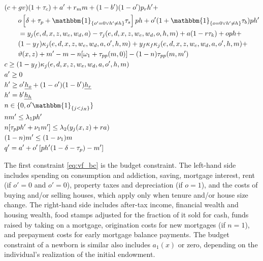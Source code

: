 \documentclass[parskip=full]{article}
\newcommand{\indicator}[1]{\mathbbm{1}_{\left\{ {#1} \right\} }}
\begin{document}
\begin{align}
  & (c+gv) (1+\tau_{c}) + a' + r_m m + (1-b')(1-o')p_{r}h' + \label{eq:vf_bc}\\
  & \qquad o\left[\delta + \tau_p + \indicator{o'=0\lor h'\neq h}\tau_s\right]ph + o' (1+\indicator{o=0\lor h'\neq h}\tau_b)ph'\notag\\
  & \qquad= y_{j}(e,d,x,z,w_{e},w_{d},a)-\tau_j(e,d,x,z,w_{e},w_{d},o,h,m) + a(1-r\tau_k)+ oph +\notag \\ &\qquad (1-y_{f})\kappa_{j}(e,d,x,z,w_{e},w_{d},a,o',h,m)+y_{f}\kappa_{f}\kappa_{j}(e,d,x,z,w_{e},w_{d},a,o',h,m)+\notag\\ & \qquad \vartheta(x,z) + m'-m- n[\omega_1+\tau_{pp}(m,0)] - (1-n)\tau_{pp}(m,m')\notag\\
  & c\geq (1-y_{f})\kappa_{j}(e,d,x,z,w_{e},w_{d},a,o',h,m)\label{eq:c_noneg}\\
  & a'\geq 0\label{eq:a_noneg}\\
  & h' \geq o'\underline{{h}_o} + (1-o')(1-b')\underline{{h}_r}\label{eq:vf_minhouse}\\
  & h' = b'\underline{{h}_h}\label{eq:vf_minhouse_homeless}\\
  & n\in \{0,o'\indicator{j<j_R}\}\label{eq:vf_orig}\\
  & n m' \leq \lambda_1 ph'\label{eq:vf_ltv}\\
  & n [\tau_p p h' + \nu_1 m'] \leq \lambda_2 (y_j(x,z) + ra)\label{eq:vf_gds}\\
  & (1-n)m'\leq (1-\nu_1) m \label{eq:vf_repay}\\
  & q' = a' + o' \left[p h'(1-\delta-\tau_p)-m'\right] \label{eq:networth}
\end{align}

The first constraint \eqref{eq:vf_bc} is the budget constraint. The left-hand side includes spending on consumption and addiction, saving, mortgage interest, rent (if $o'=0$ and $o'=0$), property taxes and depreciation (if $o=1$), and the costs of buying and/or selling houses, which apply only when tenure and/or house size change. The right-hand side includes after-tax income, financial wealth and housing wealth, food stamps adjusted for the fraction of it sold for cash, funds raised by taking on a mortgage, origination costs for new mortgages (if $n=1$), and prepayment costs for early mortgage balance payments. The budget constraint of a newborn is similar also includes $a_1(x)$ or zero, depending on the individual's realization of the initial endowment. 
\end{document}
